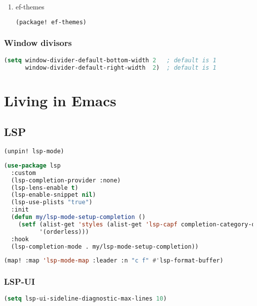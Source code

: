 \documentclass[11pt]{article}
\begin{document}
\begin{enumerate}
  \item ef-themes
  \label{sec:ef-themes}

  \begin{lstlisting}[language=Lisp]
(package! ef-themes)
\end{lstlisting}
\end{enumerate}

\subsubsection{Window divisors}
\label{sec:window-divisors}
\begin{lstlisting}[language=Lisp]
(setq window-divider-default-bottom-width 2   ; default is 1
      window-divider-default-right-width  2)  ; default is 1
\end{lstlisting}



\section{Living in Emacs}
\label{sec:living-in-emacs}


\subsection{LSP}
\label{sec:lsp}
\begin{lstlisting}[language=Lisp]
(unpin! lsp-mode)
\end{lstlisting}

\begin{lstlisting}[language=Lisp]
(use-package lsp
  :custom
  (lsp-completion-provider :none)
  (lsp-lens-enable t)
  (lsp-enable-snippet nil)
  (lsp-use-plists "true")
  :init
  (defun my/lsp-mode-setup-completion ()
    (setf (alist-get 'styles (alist-get 'lsp-capf completion-category-defaults))
          '(orderless)))
  :hook
  (lsp-completion-mode . my/lsp-mode-setup-completion))
\end{lstlisting}

\begin{lstlisting}[language=Lisp]
(map! :map 'lsp-mode-map :leader :n "c f" #'lsp-format-buffer)
\end{lstlisting}

\subsubsection{LSP-UI}
\label{sec:lsp-ui}
\begin{lstlisting}[language=Lisp]
(setq lsp-ui-sideline-diagnostic-max-lines 10)
\end{lstlisting}
\end{document}
